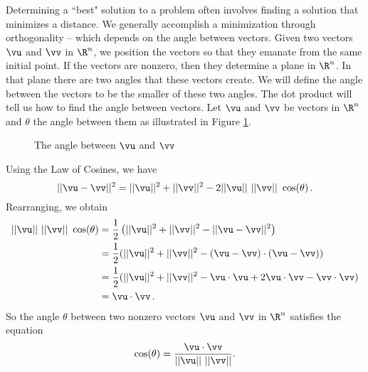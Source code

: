 \label{sec:angle_vec}

Determining a ``best" solution to a problem often involves finding a solution that minimizes a distance. We generally accomplish a minimization through orthogonality --  which depends on the angle between vectors. Given two vectors $\vu$ and $\vv$ in $\R^n$, we position the vectors so that they emanate from the same initial point. If the vectors are nonzero, then they determine a plane in $\R^n$. In that plane there are two angles that these vectors create. We will define the angle between the vectors to be the smaller of these two angles. The dot product will tell us how to find the angle between vectors. Let $\vu$ and $\vv$ be vectors in $\R^n$ and $\theta$ the angle between them as illustrated in Figure \ref{F:Angle}.
\begin{figure}[h]
\begin{center}
\end{center}
\caption{The angle between $\vu$ and $\vv$}
\label{F:Angle}
\end{figure}
Using the Law of Cosines, we have
\[ ||\vu-\vv||^2=||\vu||^2+||\vv||^2 - 2||\vu|| \ ||\vv|| \ \cos(\theta) \,.\]
Rearranging, we obtain 
\begin{align*}
||\vu|| \ ||\vv|| \ \cos(\theta) &= \frac{1}{2} \left( ||\vu||^2+||\vv||^2 - ||\vu-\vv||^2 \right) \\
&= \frac{1}{2} (||\vu||^2+||\vv||^2 - (\vu-\vv)\cdot (\vu-\vv) )\\
&= \frac{1}{2} (||\vu||^2+||\vv||^2 - \vu\cdot \vu +2\vu \cdot \vv - \vv\cdot \vv ) \\
&= \vu \cdot \vv  \, .
\end{align*}
So the angle $\theta$ between two nonzero vectors $\vu$ and $\vv$ in $\R^n$ satisfies the equation
\begin{equation} \label{eq:6_a_angle_between}\index{angle between vectors} 
\cos(\theta) = \frac{\vu \cdot \vv}{||\vu|| \ ||\vv||}.
\end{equation}


